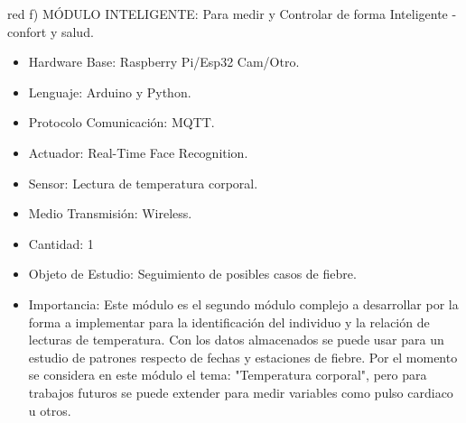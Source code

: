 \documentclass[11pt]{charter}
\begin{document}
\begin{consigna}{red}
f) MÓDULO INTELIGENTE: Para medir y Controlar de forma Inteligente - confort y salud.
\begin{itemize}
\item Hardware Base: Raspberry Pi/Esp32 Cam/Otro.
\item Lenguaje: Arduino y Python.
\item Protocolo Comunicación: MQTT.
\item Actuador: Real-Time Face Recognition.
\item Sensor: Lectura de temperatura corporal.
\item Medio Transmisión: Wireless.
\item Cantidad: 1
\item Objeto de Estudio: Seguimiento de posibles casos de fiebre.
\item Importancia: Este módulo es el segundo módulo complejo a desarrollar por la forma a implementar para la identificación del individuo y la relación de lecturas de temperatura. Con los datos almacenados se puede usar para un estudio de patrones respecto de fechas y estaciones de fiebre. Por el momento se considera en este módulo el tema: "Temperatura corporal", pero para trabajos futuros se puede extender para medir variables como pulso cardiaco u otros.
\end{itemize}
\end{consigna}
\end{document}
